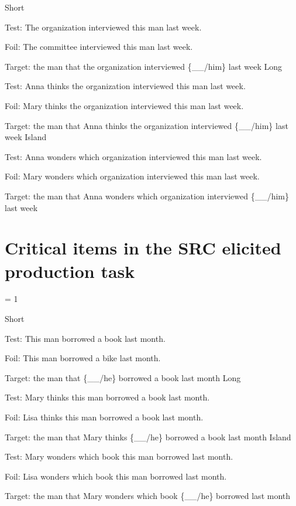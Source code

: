 \pex %
\a Short\par\nobreak
Test: The organization interviewed this man last week.\par\nobreak
Foil: The committee interviewed this man last week.\par\nobreak
Target: the man that the organization interviewed \{\_\_/him\} last week
\a Long\par\nobreak
Test: Anna thinks the organization interviewed this man last week.\par\nobreak
Foil: Mary thinks the organization interviewed this man last week.\par\nobreak
Target: the man that Anna thinks the organization interviewed \{\_\_/him\} last week
\a Island\par\nobreak
Test: Anna wonders which organization interviewed this man last week.\par\nobreak
Foil: Mary wonders which organization interviewed this man last week.\par\nobreak
Target: the man that Anna wonders which organization interviewed \{\_\_/him\} last week
\xe

\section{Critical items in the SRC elicited production task}

\excnt = 1

\pex %
\a Short\par\nobreak
Test: This man borrowed a book last month.\par\nobreak
Foil: This man borrowed a bike last month.\par\nobreak
Target: the man that \{\_\_/he\} borrowed a book last month
\a Long\par\nobreak
Test: Mary thinks this man borrowed a book last month.\par\nobreak
Foil: Lisa thinks this man borrowed a book last month.\par\nobreak
Target: the man that Mary thinks \{\_\_/he\} borrowed a book last month
\a Island\par\nobreak
Test: Mary wonders which book this man borrowed last month.\par\nobreak
Foil: Lisa wonders which book this man borrowed last month.\par\nobreak
Target: the man that Mary wonders which book \{\_\_/he\} borrowed last month
\xe


